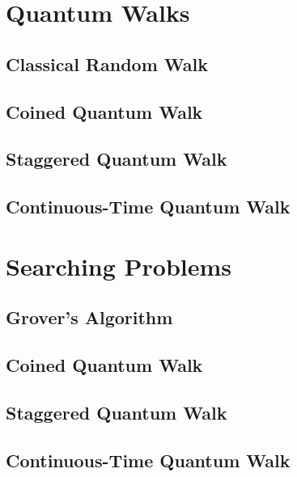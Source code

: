 \documentclass[
oneside,
11pt, a4paper,
footinclude=true,
headinclude=true,
cleardoublepage=empty
]{scrbook}
\begin{document}
\chapter{Quantum Walks}\label{chap:QuantumWalks}

\section{Classical Random Walk}\label{sec:chap3ClassicalWalk}

\section{Coined Quantum Walk}\label{sec:chap3Coinedwalk}

\section{Staggered Quantum Walk}\label{sec:chap3StagWalk}

\section{Continuous-Time Quantum Walk}\label{sec:chap3Contwalk}



\chapter{Searching Problems}\label{chap:searchingProblems}

\section{Grover's Algorithm}\label{sec:GrovSearchSimul}

\section{Coined Quantum Walk}\label{sec:CoinedSearchSimul}

\section{Staggered Quantum Walk}\label{sec:StagSearchSimul}

\section{Continuous-Time Quantum Walk}\label{sec:ContSearchSimul}

\end{document}
